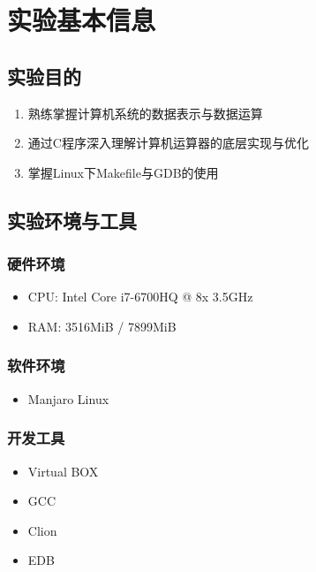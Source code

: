 \section{实验基本信息}

\subsection{实验目的}
\begin{enumerate}
    \item 熟练掌握计算机系统的数据表示与数据运算
    \item 通过C程序深入理解计算机运算器的底层实现与优化
    \item 掌握Linux下Makefile与GDB的使用
\end{enumerate}

\subsection{实验环境与工具}

\subsubsection{硬件环境}
\begin{itemize}
    \item CPU: Intel Core i7-6700HQ @ 8x 3.5GHz
    \item RAM: 3516MiB / 7899MiB
\end{itemize}

\subsubsection{软件环境}
\begin{itemize}
    \item Manjaro Linux

\end{itemize}

\subsubsection{开发工具}
\begin{itemize}
    \item Virtual BOX
    \item GCC
    \item Clion
    \item EDB
\end{itemize}